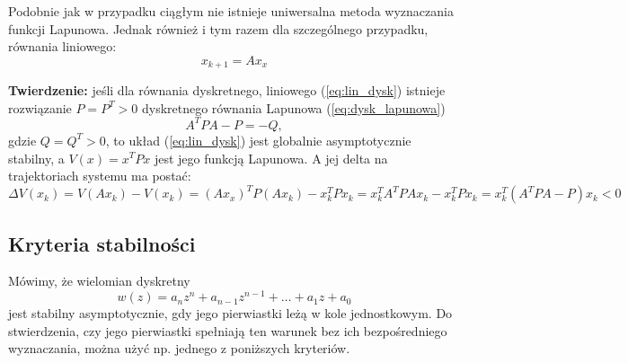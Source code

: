 \documentclass{article}
\begin{document}
    Podobnie jak w przypadku ciągłym nie istnieje uniwersalna metoda wyznaczania funkcji Lapunowa.
    Jednak również i tym razem dla szczególnego przypadku, równania liniowego:
    \begin{equation}
        \label{eq:lin_dysk}
        x_{k+1} = Ax_{x}    
    \end{equation}
    
    \textbf{Twierdzenie:} jeśli dla równania dyskretnego, liniowego (\ref{eq:lin_dysk}) istnieje rozwiązanie $P=P^{T}>0$ dyskretnego równania Lapunowa (\ref{eq:dysk_lapunowa})
    \begin{equation}
        \label{eq:dysk_lapunowa}
        A^{T}PA - P = -Q,
    \end{equation}
    gdzie $Q=Q^{T}>0$, to układ (\ref{eq:lin_dysk}) jest globalnie asymptotycznie stabilny, a $V(x) = x^{T}Px$ jest jego funkcją Lapunowa.
    A jej delta na trajektoriach systemu ma postać:
    $$
        \Delta V(x_{k}) = V(Ax_{k}) - V(x_{k}) = (Ax_{x})^{T}P(Ax_{k}) - x_{k}^{T}Px_{k} =x_{k}^{T}A^{T}PAx_{k} - x_{k}^{T}Px_{k} = x_{k}^{T}(A^{T}PA-P)x_{k} < 0
    $$

    \subsection{Kryteria stabilności}
    Mówimy, że wielomian dyskretny
    \begin{equation}
            \label{eq:wielomian}
            w(z) = a_{n}z^n + a_{n-1}z^{n-1} + \dots + a_{1}z + a_{0}
        \end{equation}
    jest stabilny asymptotycznie, gdy jego pierwiastki leżą w kole jednostkowym.
    Do stwierdzenia, czy jego pierwiastki spełniają ten warunek bez ich bezpośredniego wyznaczania, można użyć np. jednego z poniższych kryteriów.

\end{document}
